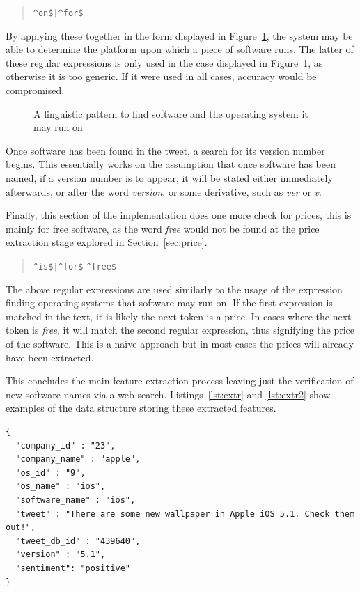 \begin{quote}
\verb~^on$|^for$~
\end{quote}

By applying these together in the form displayed in Figure~\ref{fig:rule2}, the system may be able to determine the platform upon which a piece of software runs. The latter of these regular expressions is only used in the case displayed in Figure~\ref{fig:rule2}, as otherwise it is too generic. If it were used in all cases, accuracy would be compromised.

\begin{figure}[h!]
 \centering
  
  \caption{A linguistic pattern to find software and the operating system it may run on
    \label{fig:rule2}}
\end{figure}

Once software has been found in the tweet, a search for its version number begins. This essentially works on the assumption that once software has been named, if a version number is to appear, it will be stated either immediately afterwards, or after the word \emph{version}, or some derivative, such as \emph{ver} or \emph{v}.

Finally, this section of the implementation does one more check for prices, this is mainly for free software, as the word \emph{free} would not be found at the price extraction stage explored in Section~\ref{sec:price}. 
\begin{quote}
\verb~^is$|^for$~
\newline
\verb~^free$~
\end{quote}

The above regular expressions are used similarly to the usage of the expression finding operating systems that software may run on. If the first expression is matched in the text, it is likely the next token is a price. In cases where the next token is \emph{free}, it will match the second regular expression, thus signifying the price of the software. This is a na\"{i}ve approach but in most cases the prices will already have been extracted.

This concludes the main feature extraction process leaving just the verification of new software names via a web search. Listings~\ref{lst:extr} and \ref{lst:extr2} show examples of the data structure storing these extracted features.

\begin{lstlisting}[caption=Example of some extracted features, label=lst:extr]
{
  "company_id" : "23",
  "company_name" : "apple",
  "os_id" : "9",
  "os_name" : "ios",
  "software_name" : "ios",
  "tweet" : "There are some new wallpaper in Apple iOS 5.1. Check them out!",
  "tweet_db_id" : "439640",
  "version" : "5.1",
  "sentiment": "positive"
}
\end{lstlisting}

